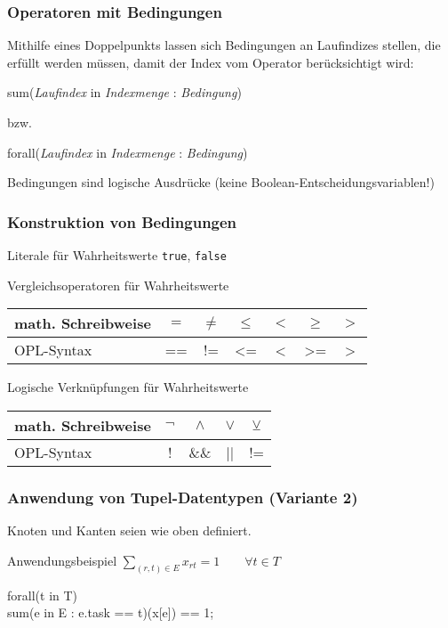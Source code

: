 \begin{frame}
 \frametitle{Operatoren mit Bedingungen}
 Mithilfe eines Doppelpunkts lassen sich Bedingungen an Laufindizes stellen, die erfüllt werden müssen, damit der Index vom Operator berücksichtigt wird:
 \begin{center}\ttfamily
  sum(\textsf{\textsl{Laufindex}} in \textsf{\textsl{Indexmenge}} : \textsf{\textsl{Bedingung}})
 \end{center}
 bzw. 
 \begin{center}\ttfamily
  forall(\textsf{\textsl{Laufindex}} in \textsf{\textsl{Indexmenge}} : \textsf{\textsl{Bedingung}})
 \end{center}
 Bedingungen sind logische Ausdrücke (keine Boolean-Entscheidungsvariablen!)
\end{frame}

\begin{frame}
 \frametitle{Konstruktion von Bedingungen}
 \begin{block}{Literale für Wahrheitswerte}
  \texttt{true}, \texttt{false}
 \end{block}
 \begin{block}{Vergleichsoperatoren für Wahrheitswerte}
  \centering\ttfamily
  \begin{tabular}{lcccccc}
    \toprule
    \textrm{math. Schreibweise} & $=$ & $\neq$ & $\leq$ & $<$ & $\geq$ & $>$ \\
    \midrule
    \textrm{OPL-Syntax} & == & != & <= & < & >= & >\\
    \bottomrule
  \end{tabular}
 \end{block}
 \begin{block}{Logische Verknüpfungen für Wahrheitswerte}
  \centering\ttfamily
  \begin{tabular}{lcccc}
    \toprule
    \textrm{math. Schreibweise} & $\neg$ & $\wedge$ & $\vee$ & $\veebar$\\
    \midrule
    \textrm{OPL-Syntax} & ! & \&\& & || & != \\
    \bottomrule
  \end{tabular}
 \end{block}
\end{frame}

\begin{frame}
 \frametitle{Anwendung von Tupel-Datentypen (Variante 2)}
 Knoten und Kanten seien wie oben definiert.
 
 \begin{block}{Anwendungsbeispiel}
  $\displaystyle\sum_{(r, t)\in E} x_{rt} = 1  \qquad\forall t\in T$\\
  \begin{center}
  \end{center}
  {\ttfamily forall(\alert{t} in T)\\
  \quad sum(e in E : e.task == \alert{t})(x[e]) == 1;}
 \end{block}
\end{frame}


